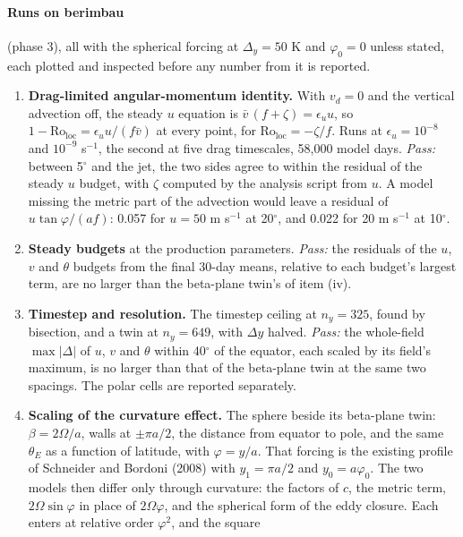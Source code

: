 \documentclass[11pt]{article}
\newcommand{\Ro}{\mathrm{Ro}}
\begin{document}
\paragraph{Runs on berimbau} (phase 3), all with the spherical forcing at
$\Delta_y = 50$ K and $\varphi_0 = 0$ unless stated, each plotted and inspected
before any number from it is reported.
\begin{enumerate}[label=(\roman*)]
\item \textbf{Drag-limited angular-momentum identity.} With $v_d = 0$ and the
  vertical advection off, the steady $u$ equation is
  $\bar v\,(f + \zeta) = \epsilon_u u$, so
  $1 - \Ro_{\mathrm{loc}} = \epsilon_u u/(f\bar v)$ at every point, for
  $\Ro_{\mathrm{loc}} = -\zeta/f$. Runs at $\epsilon_u = 10^{-8}$ and
  $10^{-9}$ s$^{-1}$, the second at five drag timescales, 58,000 model days.
  \emph{Pass:} between 5$^\circ$ and the jet, the two sides agree to within the residual of the steady
  $u$ budget, with $\zeta$ computed by the analysis script from $u$. A model
  missing the metric part of the advection would leave a residual of
  $u\tan\varphi/(af)$: 0.057 for $u = 50$ m s$^{-1}$ at 20$^\circ$, and 0.022
  for 20 m s$^{-1}$ at 10$^\circ$.
\item \textbf{Steady budgets} at the production parameters. \emph{Pass:} the
  residuals of the $u$, $v$ and $\theta$ budgets from the final 30-day means,
  relative to each budget's largest term, are no larger than the beta-plane
  twin's of item (iv).
\item \textbf{Timestep and resolution.} The timestep ceiling at $n_y = 325$,
  found by bisection, and a twin at $n_y = 649$, with $\Delta y$ halved.
  \emph{Pass:} the whole-field $\max|\Delta|$ of $u$, $v$ and $\theta$ within
  40$^\circ$ of the equator, each scaled by its field's maximum, is no larger
  than that of the beta-plane twin at the same two spacings. The polar cells
  are reported separately.
\item \textbf{Scaling of the curvature effect.} The sphere beside its
  beta-plane twin: $\beta = 2\Omega/a$, walls at $\pm\pi a/2$, the distance
  from equator to pole, and the same $\theta_E$ as a function of latitude, with
  $\varphi = y/a$. That forcing is the existing profile of Schneider and
  Bordoni (2008) with $y_1 = \pi a/2$ and $y_0 = a\varphi_0$. The two models
  then differ only through curvature: the factors of $c$, the metric term,
  $2\Omega\sin\varphi$ in place of $2\Omega\varphi$, and the spherical form of
  the eddy closure. Each enters at relative order $\varphi^2$, and the square

\end{enumerate}
\end{document}
